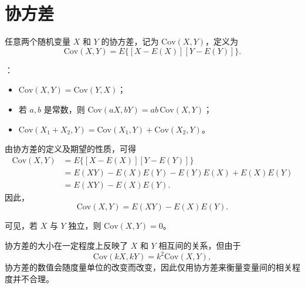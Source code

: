 \section{协方差}
\begin{definition}
任意两个随机变量 $X$ 和 $Y$ 的协方差，记为 $\mathrm{Cov}(X,Y)$，定义为
\[
\mathrm{Cov}(X,Y) = E\{[X - E(X)][Y - E(Y)]\}.
\]
\end{definition}
\begin{theorem}[协方差的简单性质如下]：
\begin{itemize}
  \item[(1)] $\mathrm{Cov}(X,Y) = \mathrm{Cov}(Y,X)$；
  \item[(2)] 若 $a,b$ 是常数，则 $\mathrm{Cov}(aX,bY) = ab\,\mathrm{Cov}(X,Y)$；
  \item[(3)] $\mathrm{Cov}(X_1 + X_2, Y) = \mathrm{Cov}(X_1, Y) + \mathrm{Cov}(X_2, Y)$。
\end{itemize}
\end{theorem}
\begin{proposition}[计算协方差的一个简单公式]
由协方差的定义及期望的性质，可得
\[
\begin{aligned}
\mathrm{Cov}(X,Y)
&=E\{[X-E(X)][Y-E(Y)]\} \\[4pt]
&=E(XY)-E(X)E(Y)-E(Y)E(X)+E(X)E(Y) \\[4pt]
&=E(XY)-E(X)E(Y).
\end{aligned}
\]
因此，
\[
\mathrm{Cov}(X,Y)=E(XY)-E(X)E(Y).
\]
\end{proposition}
\begin{note}
可见，若 $X$ 与 $Y$ 独立，则 $\mathrm{Cov}(X,Y)=0$。

协方差的大小在一定程度上反映了 $X$ 和 $Y$ 相互间的关系，但由于
\[
\mathrm{Cov}(kX,kY)=k^2\mathrm{Cov}(X,Y),
\]
协方差的数值会随度量单位的改变而改变，因此仅用协方差来衡量变量间的相关程度并不合理。
\end{note}

